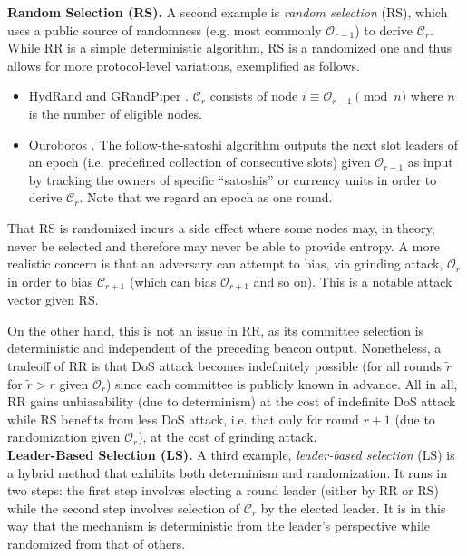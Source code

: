 \documentclass[letterpaper,twocolumn,10pt]{article}
\theoremstyle{definition}
\theoremstyle{remark}
\begin{document}
\noindent\textbf{Random Selection (RS).} A second example is \textit{random selection} (RS), which uses a public source of randomness (e.g. most commonly $\mathcal{O}_{r - 1}$) to derive $\mathcal{C}_r$. While RR is a simple deterministic algorithm, RS is a randomized one and thus allows for more protocol-level variations, exemplified as follows.
\begin{itemize}
\item HydRand \cite{schindler2020hydrand} and GRandPiper \cite{bhat2020randpiper}. $\mathcal{C}_r$ consists of node $i \equiv \mathcal{O}_{r - 1} \pmod{\tilde{n}}$ where $\tilde{n}$ is the number of eligible nodes.
\item Ouroboros \cite{kiayias2017ouroboros}. The follow-the-satoshi algorithm \cite{bentov2014proof,kiayias2017ouroboros} outputs the next slot leaders of an epoch (i.e. predefined collection of consecutive slots) given $\mathcal{O}_{r - 1}$ as input by tracking the owners of specific ``satoshis'' or currency units in order to derive $\mathcal{C}_r$. Note that we regard an epoch as one round.
\end{itemize}

That RS is randomized incurs a side effect where some nodes may, in theory, never be selected and therefore may never be able to provide entropy. A more realistic concern is that an adversary can attempt to bias, via grinding attack, $\mathcal{O}_r$ in order to bias $\mathcal{C}_{r + 1}$ (which can bias $\mathcal{O}_{r + 1}$ and so on). This is a notable attack vector given RS.

On the other hand, this is not an issue in RR, as its committee selection is deterministic and independent of the preceding beacon output. Nonetheless, a tradeoff of RR is that DoS attack becomes indefinitely possible (for all rounds $\tilde{r}$ for $\tilde{r} > r$ given $\mathcal{O}_r$) since each committee is publicly known in advance. All in all, RR gains unbiasability (due to determinism) at the cost of indefinite DoS attack while RS benefits from less DoS attack, i.e. that only for round $r + 1$ (due to randomization given $\mathcal{O}_r$), at the cost of grinding attack.\\

\noindent\textbf{Leader-Based Selection (LS).} A third example, \textit{leader-based selection} (LS) is a hybrid method that exhibits both determinism and randomization. It runs in two steps: the first step involves electing a round leader (either by RR or RS) while the second step involves selection of $\mathcal{C}_r$ by the elected leader. It is in this way that the mechanism is deterministic from the leader's perspective while randomized from that of others.
\end{document}
